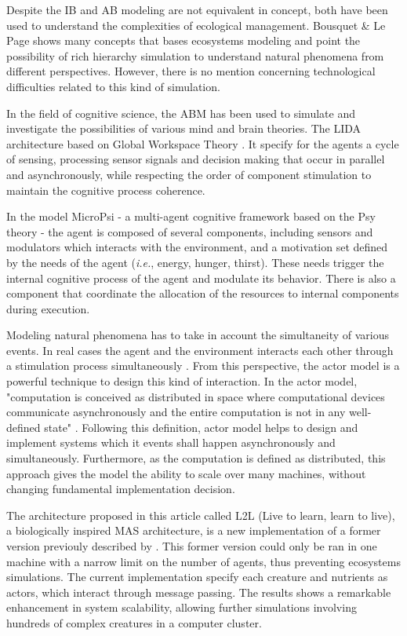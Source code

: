 \documentclass[runningheads]{llncs}
\begin{document}
Despite the IB and AB modeling are not equivalent in concept, both have been used to understand the complexities of ecological management. Bousquet \& Le Page\cite{Bousquet2004} shows many concepts that bases ecosystems modeling and point the possibility of rich hierarchy simulation to understand natural phenomena from different perspectives. However, there is no mention concerning technological difficulties related to this kind of simulation.

In the field of cognitive science, the ABM has been used to  simulate and investigate the possibilities of various mind and brain theories. The LIDA architecture based on Global Workspace Theory \cite{Friedlander2008}. It specify for the agents a cycle of sensing, processing sensor signals and decision making that occur in parallel and asynchronously, while respecting the order of component stimulation to maintain the cognitive process coherence.

In the model MicroPsi - a multi-agent cognitive framework based on the Psy theory \cite{Bach2003} \cite{Bach2012} - the agent is composed of several components, including sensors and modulators which interacts with the environment, and a motivation set defined by the needs of the agent (\textit{i.e.},  energy, hunger, thirst). These needs trigger the internal cognitive process of the agent and modulate its behavior. There is also a component that coordinate the allocation of the resources to internal components during execution. 

Modeling natural phenomena has to take in account the simultaneity of various events. In real cases the agent and the environment interacts each other through a stimulation process simultaneously \cite{Maturana1987}. From this perspective, the actor model is a powerful technique to design this kind of interaction. In the actor model, "computation  is  conceived  as  distributed  in space where computational devices communicate asynchronously and the entire  computation  is  not  in  any  well-defined  state" \cite{Hewitt2012}. Following this definition, actor model helps to design and implement systems which it events  shall happen asynchronously and simultaneously. Furthermore, as the computation is defined as distributed, this approach gives the model the ability to scale over many machines, without changing fundamental implementation decision. 

The architecture proposed in this article called L2L (Live to learn, learn to live), a biologically inspired MAS architecture, is a new implementation of a former version previouly described by \cite{Campos}. This former version could only be ran in one machine with a narrow limit on the number of agents, thus preventing ecosystems simulations. The current implementation specify each creature and nutrients as actors, which interact through message passing. The results shows a remarkable enhancement in system scalability, allowing further simulations involving hundreds of complex creatures in a computer cluster. 
\end{document}
